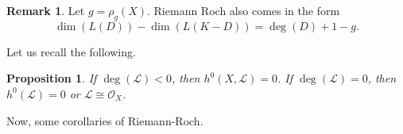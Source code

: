 \documentclass[10pt]{article}
\newtheorem{prop}[thm]{Proposition}
\theoremstyle{definition}
\newtheorem{exmp}[thm]{Example}
\newtheorem{rmk}[thm]{Remark}
\newcommand{\OO}{\mathcal{O}}
\newcommand{\LL}{\mathcal{L}}
\begin{document}
\begin{rmk}
Let $g = \rho_g(X)$.  Riemann Roch also comes in the form
$$\dim(L(D)) - \dim(L(K-D)) = \deg(D) + 1 - g.$$
\end{rmk}


%

Let us recall the following.
\begin{prop}
If $\deg(\mathcal{L}) < 0$, then $h^0(X, \mathcal{L}) = 0$.  If $\deg(\LL) = 0$, then $h^0(\LL) = 0$ or $\LL \cong \OO_X$.
\end{prop}


%
Now, some corollaries of Riemann-Roch.
\end{document}
